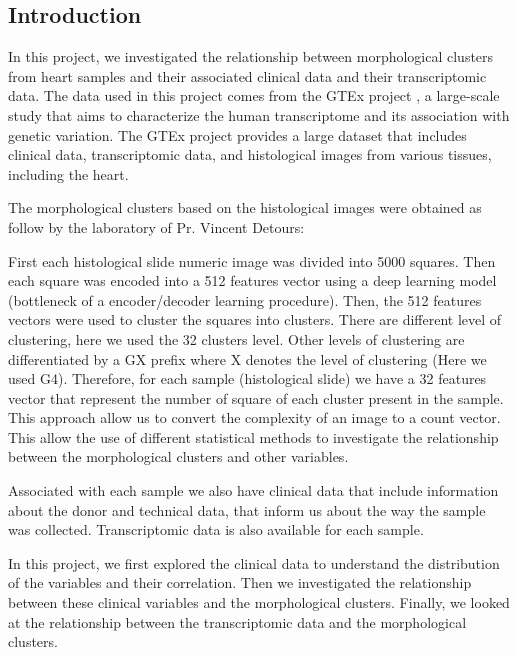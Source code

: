 \documentclass[a4paper, 11pt]{article}
\begin{document}
\begin{multicols}{2}

\section*{Introduction}

In this project, we investigated the relationship between morphological clusters from heart samples and their associated clinical data and their transcriptomic data.
The data used in this project comes from the GTEx project \citep{lonsdale2013genotype}, a large-scale study that aims to characterize the human transcriptome and its association with genetic variation.
The GTEx project provides a large dataset that includes clinical data, transcriptomic data, and histological images from various tissues, including the heart.


The morphological clusters based on the histological images were obtained as follow by the laboratory of Pr. Vincent Detours: 

First each histological slide numeric image was divided into 5000 squares.
Then each square was encoded into a 512 features vector using a deep learning model (bottleneck of a encoder/decoder learning procedure). 
Then, the 512 features vectors were used to cluster the squares into clusters. 
There are different level of clustering, here we used the 32 clusters level.
Other levels of clustering are differentiated by a GX prefix where X denotes the level of clustering (Here we used G4).
Therefore, for each sample (histological slide) we have a 32 features vector that represent the number of square of each cluster present in the sample.
This approach allow us to convert the complexity of an image to a count vector. 
This allow the use of different statistical methods to investigate the relationship between the morphological clusters and other variables.

Associated with each sample we also have clinical data that include information about the donor and technical data, that inform us about the way the sample was collected.
Transcriptomic data is also available for each sample. 

In this project, we first explored the clinical data to understand the distribution of the variables and their correlation.
Then we investigated the relationship between these clinical variables and the morphological clusters.
Finally, we looked at the relationship between the transcriptomic data and the morphological clusters.


\end{multicols}
\end{document}
